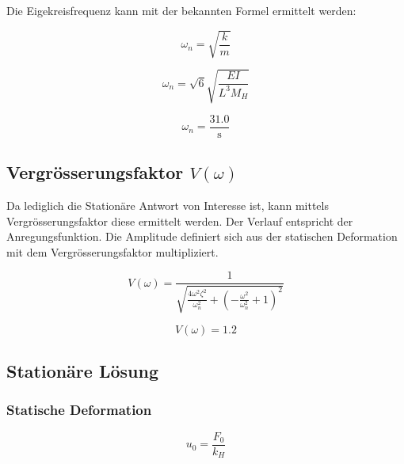 \documentclass[
  letterpaper,
  DIV=11]{scrreprt}
\begin{document}
Die Eigekreisfrequenz kann mit der bekannten Formel ermittelt werden:

\begin{equation}\omega_{n} = \sqrt{\frac{k}{m}}\end{equation}

\begin{equation}\omega_{n} = \sqrt{6} \sqrt{\frac{E I}{L^{3} M_{H}}}\end{equation}

\begin{equation}\omega_{n} = \frac{31.0}{\text{s}}\end{equation}

\hypertarget{vergruxf6sserungsfaktor-vomega}{%
\subsection{\texorpdfstring{Vergrösserungsfaktor
\(V(\omega)\)}{Vergrösserungsfaktor V(\textbackslash omega)}}\label{vergruxf6sserungsfaktor-vomega}}

Da lediglich die Stationäre Antwort von Interesse ist, kann mittels
Vergrösserungsfaktor diese ermittelt werden. Der Verlauf entspricht der
Anregungsfunktion. Die Amplitude definiert sich aus der statischen
Deformation mit dem Vergrösserungsfaktor multipliziert.

\begin{equation}V{\left(\omega \right)} = \frac{1}{\sqrt{\frac{4 \omega^{2} \zeta_{}^{2}}{\omega_{n}^{2}} + \left(- \frac{\omega^{2}}{\omega_{n}^{2}} + 1\right)^{2}}}\end{equation}

\begin{equation}V{\left(\omega \right)} = 1.2\end{equation}

\hypertarget{stationuxe4re-luxf6sung}{%
\subsection{Stationäre Lösung}\label{stationuxe4re-luxf6sung}}

\hypertarget{statische-deformation-2}{%
\subsubsection{Statische Deformation}\label{statische-deformation-2}}

\begin{equation}u_{0} = \frac{F_{0}}{k_{H}}\end{equation}
\end{document}
